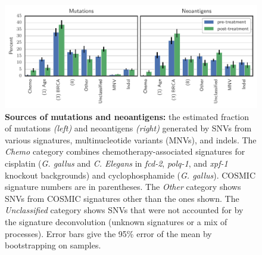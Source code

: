 \begin{figure}[htbp]
\centering
\includegraphics[scale=1.0]{figures/sources_of_mutations_and_neoantigens.pdf}
\caption{\textbf{Sources of mutations and neoantigens:} the estimated fraction of mutations \textit{(left)} and neoantigens \textit{(right)} generated by SNVs from various signatures, multinucleotide variants (MNVs), and indels. The \textit{Chemo} category combines chemotherapy-associated signatures for cisplatin (\textit{G. gallus} and \textit{C. Elegans} in \textit{fcd-2}, \textit{polq-1}, and \textit{xpf-1} knockout backgrounds) and cyclophosphamide (\textit{G. gallus}). COSMIC signature numbers are in parentheses. The \textit{Other} category shows SNVs from COSMIC signatures other than the ones shown. The \textit{Unclassified} category shows SNVs that were not accounted for by the signature deconvolution (unknown signatures or a mix of processes). Error bars give the 95\% error of the mean by bootstrapping on samples.}
\label{fig:sources}
\end{figure}